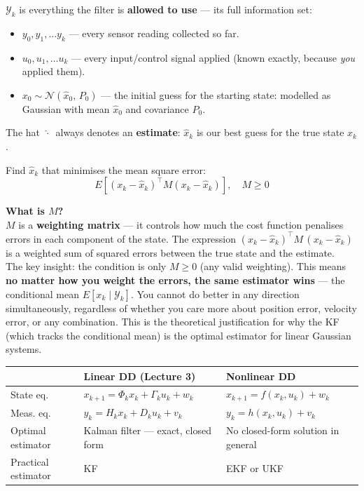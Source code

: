 \documentclass[12pt, a4paper]{article}
\begin{document}
\begin{notebox}
  $\mathcal{Y}_k$ is everything the filter is \textbf{allowed to use} ---
  its full information set:
  \begin{itemize}[leftmargin=1.4em, topsep=2pt]
    \item $y_0, y_1, \ldots y_k$ --- every sensor reading collected so far.
    \item $u_0, u_1, \ldots u_k$ --- every input/control signal applied
          (known exactly, because \emph{you} applied them).
    \item $x_0 \sim \mathcal{N}(\hat{x}_0,\, P_0)$ --- the initial guess
          for the starting state: modelled as Gaussian with mean
          $\hat{x}_0$ and covariance $P_0$.
  \end{itemize}
  The hat $\,\hat{\cdot}\,$ always denotes an \textbf{estimate}:
  $\hat{x}_k$ is our best guess for the true state $x_k$.
\end{notebox}

Find $\hat{x}_k$ that minimises the mean square error:
\[
  E\!\left[(x_k - \hat{x}_k)^\top M (x_k - \hat{x}_k)\right], \quad M \geq 0
\]

\begin{notebox}
  \textbf{What is $M$?}\\
  $M$ is a \textbf{weighting matrix} --- it controls how much the cost
  function penalises errors in each component of the state.
  The expression $(x_k - \hat{x}_k)^\top M\,(x_k - \hat{x}_k)$ is a
  weighted sum of squared errors between the true state and the estimate.\\[4pt]
  The key insight: the condition is only $M \geq 0$ (any valid weighting).
  This means \textbf{no matter how you weight the errors, the same
  estimator wins} --- the conditional mean $E[x_k \mid \mathcal{Y}_k]$.
  You cannot do better in any direction simultaneously, regardless of
  whether you care more about position error, velocity error, or any
  combination.
  This is the theoretical justification for why the KF (which tracks
  the conditional mean) is the optimal estimator for linear Gaussian
  systems.
\end{notebox}

\begin{center}
\renewcommand{\arraystretch}{1.5}
\begin{tabular}{p{2cm} p{6cm} p{6cm}}
  \toprule
  & \textbf{Linear DD (Lecture 3)} & \textbf{Nonlinear DD} \\
  \midrule
  State eq. &
    $x_{k+1} = \Phi_k x_k + \Gamma_k u_k + w_k$ &
    $x_{k+1} = f(x_k, u_k) + w_k$ \\
  Meas. eq. &
    $y_k = H_k x_k + D_k u_k + v_k$ &
    $y_k = h(x_k, u_k) + v_k$ \\
  Optimal estimator &
    Kalman filter --- exact, closed form &
    No closed-form solution in general \\
  Practical estimator &
    KF &
    EKF or UKF \\
  \bottomrule
\end{tabular}
\end{center}
\end{document}
